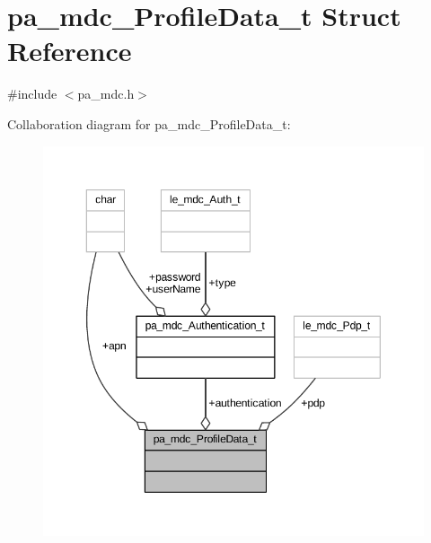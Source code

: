 \hypertarget{structpa__mdc___profile_data__t}{}\section{pa\+\_\+mdc\+\_\+\+Profile\+Data\+\_\+t Struct Reference}
\label{structpa__mdc___profile_data__t}


{\ttfamily \#include $<$pa\+\_\+mdc.\+h$>$}



Collaboration diagram for pa\+\_\+mdc\+\_\+\+Profile\+Data\+\_\+t\+:
\nopagebreak
\begin{figure}[H]
\begin{center}
\leavevmode
\includegraphics[width=350pt]{structpa__mdc___profile_data__t__coll__graph}
\end{center}
\end{figure}
